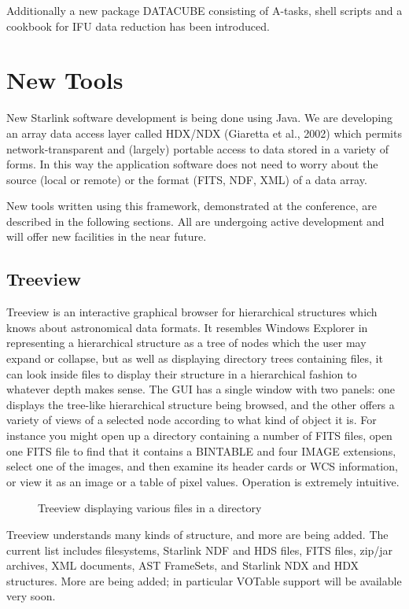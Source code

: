 Additionally a new package DATACUBE consisting of A-tasks, shell scripts
and a cookbook for IFU data reduction has been introduced.


\section{New Tools}

New Starlink software development is being done using Java.
We are developing an array data access layer called HDX/NDX
(Giaretta et al., 2002)
which permits network-transparent and (largely) portable 
access to data stored in a variety of forms.  In this way the 
application software does not need to worry about the source
(local or remote) or the format (FITS, NDF, XML) of a data array.

New tools written using this framework, 
demonstrated at the conference, are described in the following sections.
All are undergoing active development and will offer new facilities
in the near future.

\subsection{Treeview}
\label{sec:treeview}

Treeview is an interactive graphical browser for hierarchical structures
which knows about astronomical data formats.
It resembles Windows Explorer in representing a hierarchical structure
as a tree of nodes which the user may expand or collapse, 
but as well as displaying directory trees
containing files, it can look inside files to display
their structure in a hierarchical fashion to whatever depth 
makes sense.  The GUI has a single window with two panels:
one displays the tree-like hierarchical structure being browsed,
and the other offers a variety of views of a selected node according
to what kind of object it is.  For instance you might open up a directory
containing a number of FITS files, open one FITS file to find that it
contains a BINTABLE and four IMAGE extensions, select one of the
images, and then examine its header cards or WCS information, 
or view it as an image or a table of pixel values.
Operation is extremely intuitive.
\begin{figure}
\caption{Treeview displaying various files in a directory}
\end{figure}

Treeview understands many kinds of structure, and more are being added.
The current list includes filesystems, Starlink NDF and HDS files, 
FITS files, zip/jar archives, XML documents, 
AST FrameSets, and Starlink NDX and HDX structures.
More are being added; in particular 
VOTable support will be available very soon.

